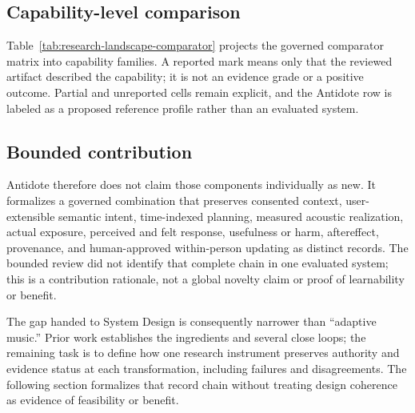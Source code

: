 \subsection{Capability-level comparison}
\label{sec:related-comparison}

Table~\ref{tab:research-landscape-comparator} projects the governed comparator
matrix into capability families. A reported mark means only that the reviewed
artifact described the capability; it is not an evidence grade or a positive
outcome. Partial and unreported cells remain explicit, and the Antidote row is
labeled as a proposed reference profile rather than an evaluated system.


\subsection{Bounded contribution}
\label{sec:bounded-contribution}

Antidote therefore does not claim those components individually as new. It
formalizes a governed combination that preserves consented context,
user-extensible semantic intent, time-indexed planning, measured acoustic
realization, actual exposure, perceived and felt response, usefulness or harm,
aftereffect, provenance, and human-approved within-person updating as distinct
records. The bounded review did not identify that complete chain in one
evaluated system; this is a contribution rationale, not a global novelty claim
or proof of learnability or benefit.

The gap handed to System Design is consequently narrower than ``adaptive
music.'' Prior work establishes the ingredients and several close loops; the
remaining task is to define how one research instrument preserves authority
and evidence status at each transformation, including failures and
disagreements. The following section formalizes that record chain without
treating design coherence as evidence of feasibility or benefit.
